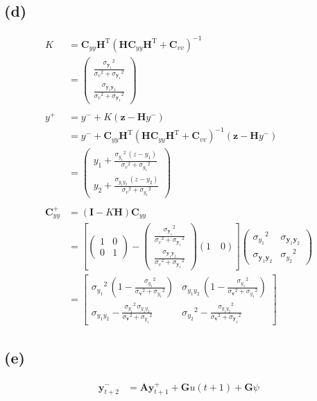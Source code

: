 \documentclass[fleqn, letterpaper]{tufte-handout}
\newcommand{\T}{^\text{T}}
\newcommand{\y}{\mathbf{y}}
\newcommand{\z}{\mathbf{z}}
\newcommand{\I}{\mathbf{I}}
\newcommand{\HH}{\mathbf{H}}
\newcommand{\A}{\mathbf{A}}
\newcommand{\GG}{\mathbf{G}}
\newcommand{\vecv}{\mathbf{v}}
\newcommand{\cyy}{\mathbf{C}_{yy}}
\newcommand{\cvv}{\mathbf{C}_{vv}}
\newcommand{\KK}{\left(\begin{array}{c} \frac{{\sigma_{\y_1}}^2}{{\sigma_v}^2 + {\sigma_{\y_1}}^2}\\ \frac{\sigma_{\y_1\y_2}}{{\sigma_v}^2 + {\sigma_{\y_1}}^2} \end{array}\right)}
\newcommand{\cyylong}{\left(\begin{array}{cc} {\sigma_{y_1}}^2 & \sigma_{\y_1\y_2}\\ \sigma_{\y_1\y_2} & {\sigma_{y_2}}^2 \end{array}\right)}
\begin{document}
\subsection{(d)}
\begin{align*}
K &= \cyy \HH\T(\HH\cyy\HH\T+\cvv)^{-1} \\
&= \KK\\ \\
y^+ &= y^- + K(\z-\HH y^-) \\
&= y^- + \cyy \HH\T(\HH\cyy\HH\T+\cvv)^{-1}(\z-\HH y^-) \\ 
&= \left(\begin{array}{c} y_1 + \frac{{\sigma_{y_1}}^2\, \left(z - y_1\right)}{{\sigma_v}^2 + {\sigma_{y_1}}^2}\\ y_2 + \frac{\sigma_{y_1y_2}\, \left(z - y_2\right)}{{\sigma_v}^2 + {\sigma_{y_1}}^2} \end{array}\right)\\ \\
\cyy^+  &= \left(\I - K\HH\right)\cyy\\
&= \left[\left(\begin{array}{cc} 1 & 0\\ 0 & 1 \end{array}\right) - \KK (1\quad 0)\right]\cyylong\\
&= \left[\begin{array}{cc}
 {\sigma_{y_1}}^2\, \left(1 -\frac{{\sigma_{y_1}}^2}{{\sigma_\vecv}^2 + {\sigma_{y_1}}^2}\right) 
 &  \sigma_{y_1y_2}\, \left(1-\frac{{\sigma_{y_1}}^2}{{\sigma_\vecv}^2 + {\sigma_{y_1}}^2}\right)\\
  \sigma_{y_1y_2} - \frac{{\sigma_{y_1}}^2\, \sigma_{y_1y_2}}{{\sigma_\vecv}^2 + {\sigma_{y_1}}^2} 
  & {\sigma_{y_2}}^2 - \frac{{\sigma_{y_1y_2}}^2}{{\sigma_\vecv}^2 + {\sigma_{\y_1}}^2} \end{array}\right]
\end{align*}
\subsection{(e)}
\begin{align*}
\y_{t+2}^- &= \A\y_{t+1}^+ + \GG u(t+1) + \GG\psi\\ \\
\end{align*}
\end{document}
